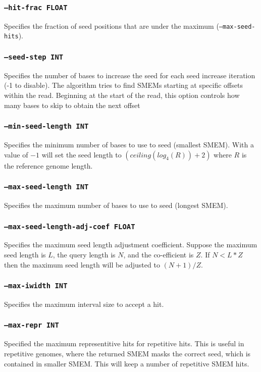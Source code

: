 \documentclass[a4paper,12pt]{book}
\newcommand{\TT}[1]{{\tt #1}} %
\begin{document}
\subsubsection{\TT{--hit-frac FLOAT}}
Specifies the fraction of seed positions that are under the maximum (\TT{--max-seed-hits}).

\subsubsection{\TT{--seed-step INT}}
Specifies the number of bases to increase the seed for each seed increase iteration (-1 to disable).
The algorithm tries to find SMEMs starting at specific offsets within the read.
Beginning at the start of the read, this option controls how many bases to skip to obtain the next offset

\subsubsection{\TT{--min-seed-length INT}}
Specifies the minimum number of bases to use to seed (smallest SMEM).
With a value of $-1$ will set the seed length to $\left(ceiling(log_4(R)) + 2\right)$ where $R$ is the reference genome length.

\subsubsection{\TT{--max-seed-length INT}}
Specifies the maximum number of bases to use to seed (longest SMEM).

\subsubsection{\TT{--max-seed-length-adj-coef FLOAT}}
Specifies the maximum seed length adjustment coefficient.
Suppose the maximum seed length is $L$, the query length is $N$, and the co-efficient is $Z$.
If $N < L * Z$ then the maximum seed length will be adjusted to $(N + 1) / Z$. 

\subsubsection{\TT{--max-iwidth INT}}
Specifies the maximum interval size to accept a hit.

\subsubsection{\TT{--max-repr INT}}
Specified the maximum representitive hits for repetitive hits.
This is useful in repetitive genomes, where the returned SMEM masks the correct seed, which is contained in smaller SMEM.
This will keep a number of repetitive SMEM hits.
\end{document}
